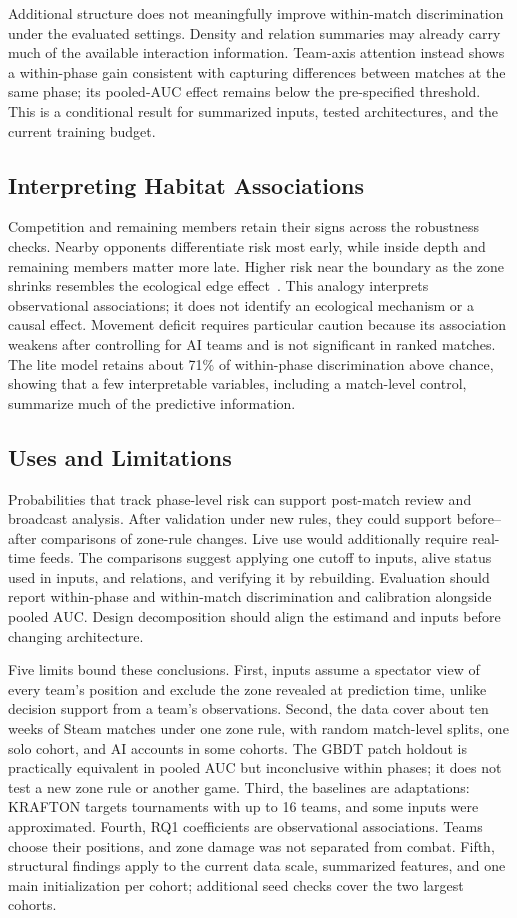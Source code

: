 \documentclass[sigconf,anonymous,nonacm]{acmart}
\begin{document}
Additional structure does not meaningfully improve within-match discrimination under the evaluated settings. Density and relation summaries may already carry much of the available interaction information. Team-axis attention instead shows a within-phase gain consistent with capturing differences between matches at the same phase; its pooled-AUC effect remains below the pre-specified threshold. This is a conditional result for summarized inputs, tested architectures, and the current training budget.

\subsection{Interpreting Habitat Associations}
Competition and remaining members retain their signs across the robustness checks. Nearby opponents differentiate risk most early, while inside depth and remaining members matter more late. Higher risk near the boundary as the zone shrinks resembles the ecological edge effect~\cite{Ries04}. This analogy interprets observational associations; it does not identify an ecological mechanism or a causal effect. Movement deficit requires particular caution because its association weakens after controlling for AI teams and is not significant in ranked matches. The lite model retains about 71\% of within-phase discrimination above chance, showing that a few interpretable variables, including a match-level control, summarize much of the predictive information.

\subsection{Uses and Limitations}
\label{sec:discussion:limits}
Probabilities that track phase-level risk can support post-match review and broadcast analysis. After validation under new rules, they could support before--after comparisons of zone-rule changes. Live use would additionally require real-time feeds. The comparisons suggest applying one cutoff to inputs, alive status used in inputs, and relations, and verifying it by rebuilding. Evaluation should report within-phase and within-match discrimination and calibration alongside pooled AUC. Design decomposition should align the estimand and inputs before changing architecture.

Five limits bound these conclusions. First, inputs assume a spectator view of every team's position and exclude the zone revealed at prediction time, unlike decision support from a team's observations. Second, the data cover about ten weeks of Steam matches under one zone rule, with random match-level splits, one solo cohort, and AI accounts in some cohorts. The GBDT patch holdout is practically equivalent in pooled AUC but inconclusive within phases; it does not test a new zone rule or another game. Third, the baselines are adaptations: KRAFTON targets tournaments with up to 16 teams, and some inputs were approximated. Fourth, RQ1 coefficients are observational associations. Teams choose their positions, and zone damage was not separated from combat. Fifth, structural findings apply to the current data scale, summarized features, and one main initialization per cohort; additional seed checks cover the two largest cohorts.
\end{document}
